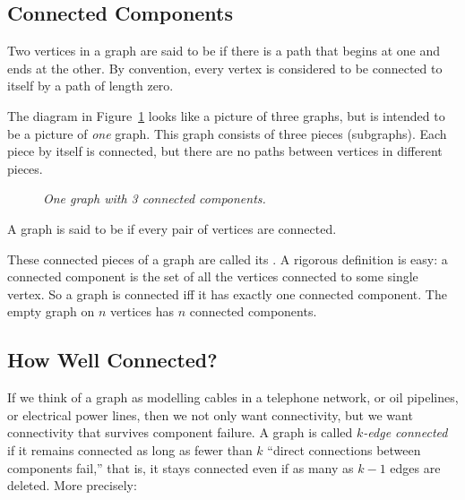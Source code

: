 \subsection{Connected Components}
\begin{definition}
  Two vertices in a graph are said to be  if there is a
  path that begins at one and ends at the other.  By convention, every
  vertex is considered to be connected to itself by a path of length zero.
\end{definition}

The diagram in Figure~\ref{fig:3comp} looks like a picture of three
graphs, but is intended to be a picture of \emph{one} graph.  This graph
consists of three pieces (subgraphs).  Each piece by itself is connected,
but there are no paths between vertices in different pieces.

\begin{figure}[htbp] 
\caption{\em One graph with 3 connected components.}
\label{fig:3comp}
\end{figure}

\begin{definition}
A graph is said to be  if every pair of vertices are
connected.
\end{definition}
These connected pieces of a graph are called its .  A rigorous definition is easy: a connected component is the
set of all the vertices connected to some single vertex.  So a graph is
connected iff it has exactly one connected component.  The empty graph on
$n$ vertices has $n$ connected components.

\subsection{How Well Connected?}
If we think of a graph as modelling cables in a telephone network, or oil
pipelines, or electrical power lines, then we not only want connectivity,
but we want connectivity that survives component failure.  A graph is
called \emph{$k$-edge connected} if it remains connected as long as fewer
than $k$ ``direct connections between components fail,'' that is, it stays
connected even if as many as $k-1$ edges are deleted.  More precisely:

